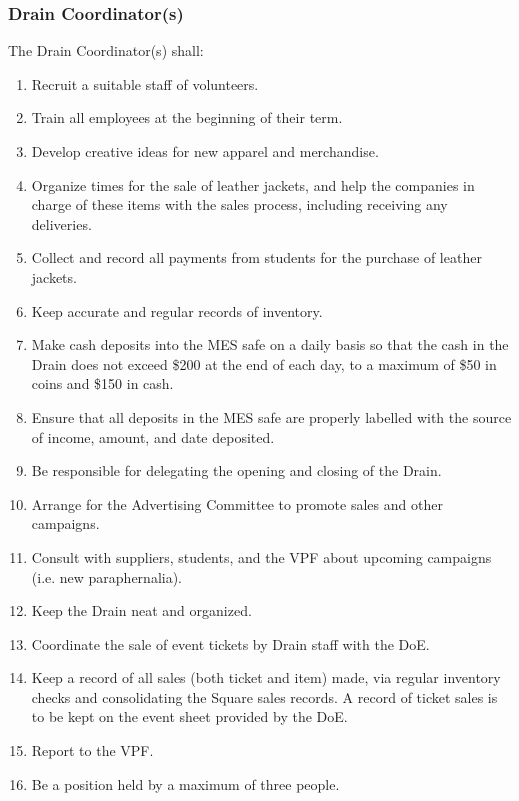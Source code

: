 \subsubsection{Drain Coordinator(s)}
\label{drain-coordinators}
The Drain Coordinator(s) shall:

\begin{enumerate}
 \item
  Recruit a suitable staff of volunteers.
 \item
  Train all employees at the beginning of their term.
 \item
  Develop creative ideas for new apparel and merchandise.
 \item
  Organize times for the sale of leather jackets, and help the companies in charge of these items with the sales process, including receiving any deliveries.
 \item
  Collect and record all payments from students for the purchase of leather jackets.
 \item
  Keep accurate and regular records of inventory.
 \item
  Make cash deposits into the MES safe on a daily basis so that the cash in the Drain does not exceed \$200 at the end of each day, to a maximum of \$50 in coins and \$150 in cash.
 \item
  Ensure that all deposits in the MES safe are properly labelled with the source of income, amount, and date deposited.
 \item
  Be responsible for delegating the opening and closing of the Drain.
 \item
  Arrange for the Advertising Committee to promote sales and other campaigns.
 \item
  Consult with suppliers, students, and the VPF about upcoming campaigns (i.e. new paraphernalia).
 \item
  Keep the Drain neat and organized.
 \item
  Coordinate the sale of event tickets by Drain staff with the DoE.
 \item
  Keep a record of all sales (both ticket and item) made, via regular inventory checks and consolidating the Square sales records. A record of ticket sales is to be kept on the event sheet provided by the DoE.
 \item
  Report to the VPF.
 \item
  Be a position held by a maximum of three people.
\end{enumerate}